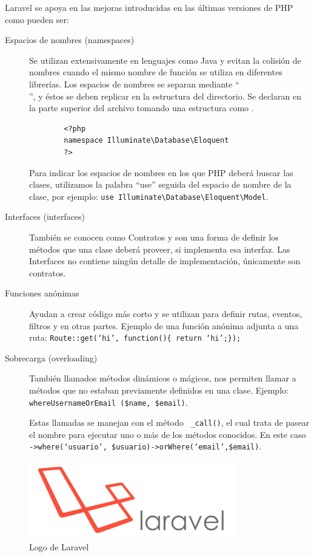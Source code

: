 Laravel se apoya en las mejoras introducidas en las últimas versiones de PHP como pueden ser:
\begin{description}
    \item[Espacios de nombres (namespaces)] Se utilizan extensivamente en lenguajes como Java y evitan la colisión de nombres cuando el mismo nombre de función se utiliza en diferentes librerías. Los espacios de nombres se separan mediante “\\”, y éstos se deben replicar en la estructura del directorio. Se declaran en la parte superior del archivo tomando una estructura como . 
    \begin{verbatim}
        <?php 
        namespace Illuminate\Database\Eloquent
        ?>
    \end{verbatim}
    Para indicar los espacios de nombres en los que PHP deberá buscar las clases, utilizamos la palabra “use” seguida del espacio de nombre de la clase, por ejemplo: \verb|use Illuminate\Database\Eloquent\Model|.
    \item[Interfaces (interfaces)]  También se conocen como Contratos y son una forma de definir los métodos que una clase deberá proveer, si implementa esa interfaz. Las Interfaces no contiene ningún detalle de implementación, únicamente son contratos.
    
    \item[Funciones anónimas] Ayudan a crear código más corto y se utilizan para definir rutas, eventos, filtros y en otras partes. Ejemplo de una función anónima adjunta a una ruta: \verb|Route::get(‘hi’, function(){ return ‘hi’;});|
    
    \item[Sobrecarga (overloading)] También llamados métodos dinámicos o mágicos, nos permiten llamar a métodos que no estaban previamente definidos en una clase. Ejemplo: \verb|whereUsernameOrEmail ($name, $email)|.  
    
    Estas llamadas se manejan con el método \verb| _call()|, el cual trata de pasear el nombre para ejecutar uno o más de los métodos conocidos. En este caso \verb|->where(‘usuario’, $usuario)->orWhere(‘email’,$email)|.


\end{description}

\begin{figure}[htb]
    \centering
    \includegraphics[width=0.8\textwidth]{imagenes/laravel-logo.png}
    \caption{Logo de Laravel}
    \label{fig:logolaravel}
\end{figure}

